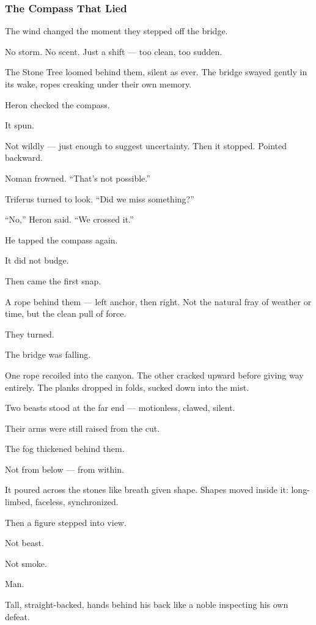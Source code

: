 \documentclass[12pt]{article}
\begin{document}
\subsubsection*{The Compass That Lied}

The wind changed the moment they stepped off the bridge.

No storm. No scent. Just a shift — too clean, too sudden.

The Stone Tree loomed behind them, silent as ever. The bridge swayed gently in its wake, ropes creaking under their own memory.

Heron checked the compass.

It spun.

Not wildly — just enough to suggest uncertainty. Then it stopped. Pointed backward.

Noman frowned. “That’s not possible.”

Triferus turned to look. “Did we miss something?”

“No,” Heron said. “We crossed it.”

He tapped the compass again.

It did not budge.

Then came the first snap.

A rope behind them — left anchor, then right. Not the natural fray of weather or time, but the clean pull of force.

They turned.

The bridge was falling.

One rope recoiled into the canyon. The other cracked upward before giving way entirely. The planks dropped in folds, sucked down into the mist.

Two beasts stood at the far end — motionless, clawed, silent.

Their arms were still raised from the cut.

\bigskip

The fog thickened behind them.

Not from below — from within.

It poured across the stones like breath given shape. Shapes moved inside it: long-limbed, faceless, synchronized.

Then a figure stepped into view.

Not beast.

Not smoke.

Man.

Tall, straight-backed, hands behind his back like a noble inspecting his own defeat.
\end{document}
